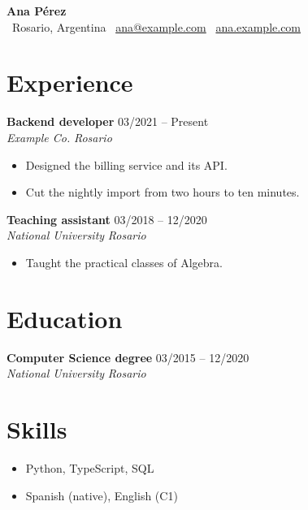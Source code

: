 \documentclass[11pt]{article}
\newcommand{\cvheader}[4]{%
  \begin{center}
    {\Huge\bfseries #1}\\[4pt]
    \faMapMarker*\ #2 \quad \faEnvelope\ \href{mailto:#3}{#3} \quad \faGlobe\ \href{https://#4}{#4}
  \end{center}}
\newcommand{\cventry}[4]{%
  \textbf{#1} \hfill #3\\
  \textit{#2} \hfill \textit{#4}\par}
\def\cvdetail#1{\item #1}
\newenvironment{cvitems}{\begin{itemize}[leftmargin=12pt,itemsep=1pt,topsep=2pt]}{\end{itemize}\vspace{4pt}}
\begin{document}
\cvheader{Ana Pérez}{Rosario, Argentina}{ana@example.com}{ana.example.com}

\section{Experience}
\cventry{Backend developer}{Example Co.}{03/2021 -- Present}{Rosario}
\begin{cvitems}
  \cvdetail{Designed the billing service and its API.}
  \cvdetail{Cut the nightly import from two hours to ten minutes.}
\end{cvitems}
\cventry{Teaching assistant}{National University}{03/2018 -- 12/2020}{Rosario}
\begin{cvitems}
  \cvdetail{Taught the practical classes of Algebra.}
\end{cvitems}

\section{Education}
\cventry{Computer Science degree}{National University}{03/2015 -- 12/2020}{Rosario}

\section{Skills}
\begin{itemize}[leftmargin=12pt]
  \item Python, TypeScript, SQL
  \item Spanish (native), English (C1)
\end{itemize}
\end{document}

